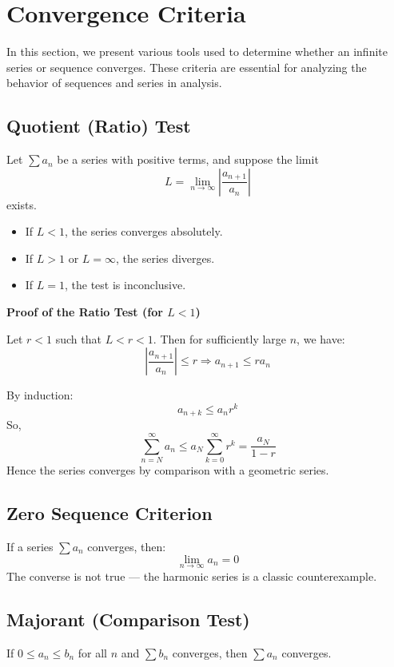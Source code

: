 \section{Convergence Criteria}

In this section, we present various tools used to determine whether an infinite series or sequence converges. These criteria are essential for analyzing the behavior of sequences and series in analysis.

\subsection{Quotient (Ratio) Test}

Let \(\sum a_n\) be a series with positive terms, and suppose the limit
\[
L = \lim_{n \to \infty} \left| \frac{a_{n+1}}{a_n} \right|
\]
exists.

\begin{itemize}[label=\(-\)]
\item If \(L < 1\), the series converges absolutely.
\item If \(L > 1\) or \(L = \infty\), the series diverges.
\item If \(L = 1\), the test is inconclusive.
\end{itemize}

\textbf{Proof of the Ratio Test (for \(L < 1\))}

Let \(r < 1\) such that \(L < r < 1\). Then for sufficiently large \(n\), we have:
\[
\left| \frac{a_{n+1}}{a_n} \right| \le r \Rightarrow a_{n+1} \le r a_n
\]

By induction:
\[
a_{n+k} \le a_n r^k
\]
So,
\[
\sum_{n=N}^\infty a_n \le a_N \sum_{k=0}^\infty r^k = \frac{a_N}{1 - r}
\]
Hence the series converges by comparison with a geometric series.

\subsection{Zero Sequence Criterion}

If a series \(\sum a_n\) converges, then:
\[
\lim_{n \to \infty} a_n = 0
\]
The converse is not true — the harmonic series is a classic counterexample.

\subsection{Majorant (Comparison Test)} 

If \(0 \le a_n \le b_n\) for all \(n\) and \(\sum b_n\) converges, then \(\sum a_n\) converges.

